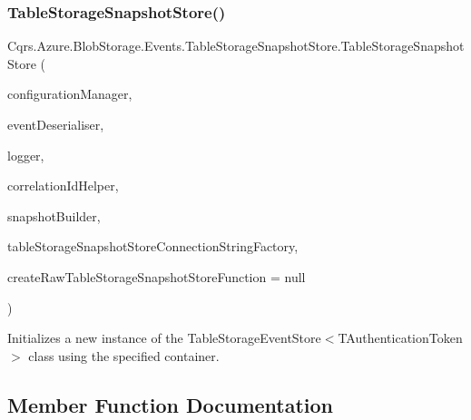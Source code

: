 \subsubsection{\texorpdfstring{Table\+Storage\+Snapshot\+Store()}{TableStorageSnapshotStore()}}
{\footnotesize\ttfamily Cqrs.\+Azure.\+Blob\+Storage.\+Events.\+Table\+Storage\+Snapshot\+Store.\+Table\+Storage\+Snapshot\+Store (\begin{DoxyParamCaption}\item[{\hyperlink{interfaceCqrs_1_1Configuration_1_1IConfigurationManager}{I\+Configuration\+Manager}}]{configuration\+Manager,  }\item[{\hyperlink{interfaceCqrs_1_1Events_1_1ISnapshotDeserialiser}{I\+Snapshot\+Deserialiser}}]{event\+Deserialiser,  }\item[{I\+Logger}]{logger,  }\item[{I\+Correlation\+Id\+Helper}]{correlation\+Id\+Helper,  }\item[{\hyperlink{interfaceCqrs_1_1Events_1_1ISnapshotBuilder}{I\+Snapshot\+Builder}}]{snapshot\+Builder,  }\item[{\hyperlink{interfaceCqrs_1_1Azure_1_1BlobStorage_1_1ITableStorageSnapshotStoreConnectionStringFactory}{I\+Table\+Storage\+Snapshot\+Store\+Connection\+String\+Factory}}]{table\+Storage\+Snapshot\+Store\+Connection\+String\+Factory,  }\item[{Func$<$ I\+Logger, \hyperlink{interfaceCqrs_1_1Azure_1_1BlobStorage_1_1ITableStorageSnapshotStoreConnectionStringFactory}{I\+Table\+Storage\+Snapshot\+Store\+Connection\+String\+Factory}, \hyperlink{classCqrs_1_1Azure_1_1BlobStorage_1_1Events_1_1TableStorageSnapshotStore_1_1RawTableStorageSnapshotStore}{Raw\+Table\+Storage\+Snapshot\+Store} $>$}]{create\+Raw\+Table\+Storage\+Snapshot\+Store\+Function = {\ttfamily null} }\end{DoxyParamCaption})}



Initializes a new instance of the Table\+Storage\+Event\+Store$<$\+T\+Authentication\+Token$>$ class using the specified container. 



\subsection{Member Function Documentation}
\mbox{\label{classCqrs_1_1Azure_1_1BlobStorage_1_1Events_1_1TableStorageSnapshotStore_a95503a8721d083d070495cb4f884c0cf_a95503a8721d083d070495cb4f884c0cf}} 
